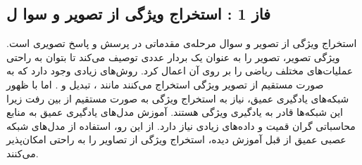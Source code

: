 \subsection{فاز 1 : استخراج ویژگی از تصویر و سوا ل} \label{sec:extract}

		استخراج ویژگی از تصویر و سوال مرحله‌ی مقدماتی در پرسش و پاسخ تصویری است. ویژگی تصویر، تصویر را به عنوان یک بردار عددی  توصیف می‌کند تا بتوان به راحتی عملیات‌های مختلف ریاضی را بر روی آن اعمال کرد. روش‌های زیادی وجود دارد که به صورت مستقیم از تصویر ویژگی استخراج می‌کنند مانند 
		، تبدیل
		و 
		.
		اما با ظهور شبکه‌های یادگیری عمیق، نیاز به استخراج ویژگی به صورت مستقیم از بین رفت زیرا این شبکه‌ها قادر به یادگیری ویژگی هستند. آموزش مدل‌های یادگیری عمیق به منابع محاسباتی گران قمیت و ‌داده‌های زیادی نیاز دارد. از این رو، استفاده از مدل‌های شبکه عصبی عمیق از قبل آموزش دیده، استخراج ویژگی‌ از تصاویر را به راحتی امکان‌پذیر می‌کنند. 
		
